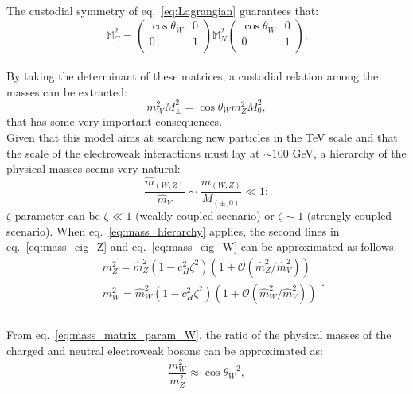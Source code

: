 The custodial symmetry of eq.~\ref{eq:Lagrangian} guarantees that:
\begin{equation}
\mathbb{M}_C^2 =
\begin{pmatrix}
\cos{{\theta}_W} & 0 \\
0 & 1 \\
\end{pmatrix}
\mathbb{M}_N^2
\begin{pmatrix}
\cos{{\theta}_W} & 0 \\
0 & 1 \\
\end{pmatrix}
.
\label{eq:custodial_matrix}
\end{equation}
\\
By taking the determinant of these matrices, a custodial relation among the masses can be extracted:
\begin{equation}
m_W^2 M_{\pm}^2 = \cos{{\theta}_W} m_Z^2 M_0^2,
\label{eq:custodial_relation}
\end{equation}
that has some very important consequences.\\
Given that this model aims at searching new particles in the TeV scale and that the scale of the electroweak interactions must lay at $\sim 100$ GeV,  a hierarchy of the physical masses seems very natural:
\begin{equation}
\frac{\hat{m}_{(W,Z)}}{\hat{m}_V} \sim \frac{{m}_{(W,Z)}}{M_{(\pm, 0)}} \ll 1
;
\label{eq:mass_hierarchy}
\end{equation}
$\zeta$ parameter can be $\zeta \ll 1$ (weakly coupled scenario) or $\zeta \sim 1$ (strongly coupled scenario). When eq.~\ref{eq:mass_hierarchy} applies, the second lines in eq.~\ref{eq:mass_eig_Z} and eq.~\ref{eq:mass_eig_W} can be approximated as follows:
\begin{equation}
\begin{split}
& m_Z^2 = \hat{m}_Z^2 \left( 1 - c_H^2 {\zeta}^2\right) \left( 1 + \mathcal{O}(\hat{m}_Z^2/\hat{m}_V^2) \right) \\
& m_W^2 = \hat{m}_W^2 \left( 1 - c_H^2 {\zeta}^2\right) \left( 1 + \mathcal{O}(\hat{m}_W^2/\hat{m}_V^2) \right) \\
\end{split}
.
\label{eq:mass_simpl}
\end{equation}
\\
From eq.~\ref{eq:mass_matrix_param_W}, the ratio of the physical masses of the charged and neutral electroweak bosons can be approximated as:
\begin{equation}
\frac{m_W^2}{m_Z^2} \approx {\cos{{\theta}_W}}^2,
\label{eq:mass_ewk_ratio}
\end{equation}
